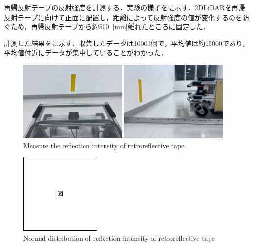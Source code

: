  再帰反射テープの反射強度を計測する．実験の様子をに示す．2DLiDARを再帰反射テープに向けて正面に配置し，距離によって反射強度の値が変化するのを防ぐため，再帰反射テープから約500 \,[mm]離れたところに固定した．
    
  計測した結果をに示す．収集したデータは10000個で，平均値は約15000であり，平均値付近にデータが集中していることがわかった．

  \begin{figure}[h]
    \centering
    \begin{minipage}[c]{65mm} 
        \centering
        \includegraphics[height=40mm]{images/RobotGuidance_exp2_tape_from_back.png}
    \end{minipage}
    \begin{minipage}[c]{65mm} 
        \centering
        \includegraphics[height=40mm]{images/RobotGuidance_exp2_tape_from_side.png}
    \end{minipage}
    \caption{Measure the reflection intensity of retroreflective tape}
    \label{Fig:RobotGuidance_exp2_tape}
  \end{figure}

  \begin{figure}[h]
    \centering
    \includegraphics[keepaspectratio, scale=0.80] {images/figure.png}
    \captionsetup{justification=raggedright} %
    \caption{Normal distribution of reflection intensity of retroreflective tape}
    \label{Fig:Normal distribution of reflection intensity of retroreflective tape}
  \end{figure}

